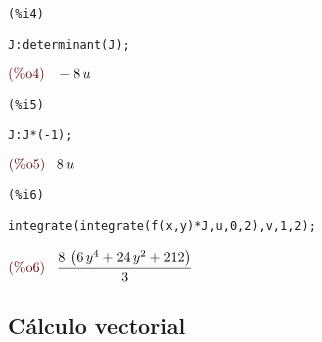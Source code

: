 \documentclass[12pt]{article}
\begin{document}
\noindent
\begin{minipage}[t]{8ex}{\color{red}\bf
\begin{verbatim}
(%i4) 
\end{verbatim}}
\end{minipage}
\begin{minipage}[t]{\textwidth}{\color{blue}
\begin{verbatim}
J:determinant(J);
\end{verbatim}}
\end{minipage}
\begin{math}\displaystyle
\parbox{8ex}{\color{labelcolor}(\%o4) }
-8\,u
\end{math}


\noindent
\begin{minipage}[t]{8ex}{\color{red}\bf
\begin{verbatim}
(%i5) 
\end{verbatim}}
\end{minipage}
\begin{minipage}[t]{\textwidth}{\color{blue}
\begin{verbatim}
J:J*(-1);
\end{verbatim}}
\end{minipage}
\begin{math}\displaystyle
\parbox{8ex}{\color{labelcolor}(\%o5) }
8\,u
\end{math}


\noindent
\begin{minipage}[t]{8ex}{\color{red}\bf
\begin{verbatim}
(%i6) 
\end{verbatim}}
\end{minipage}
\begin{minipage}[t]{\textwidth}{\color{blue}
\begin{verbatim}
integrate(integrate(f(x,y)*J,u,0,2),v,1,2);
\end{verbatim}}
\end{minipage}
\begin{math}\displaystyle
\parbox{8ex}{\color{labelcolor}(\%o6) }
\frac{8\,\left( 6\,{y}^{4}+24\,{y}^{2}+212\right) }{3}
\end{math}

\subsection{Cálculo vectorial}
\end{document}
